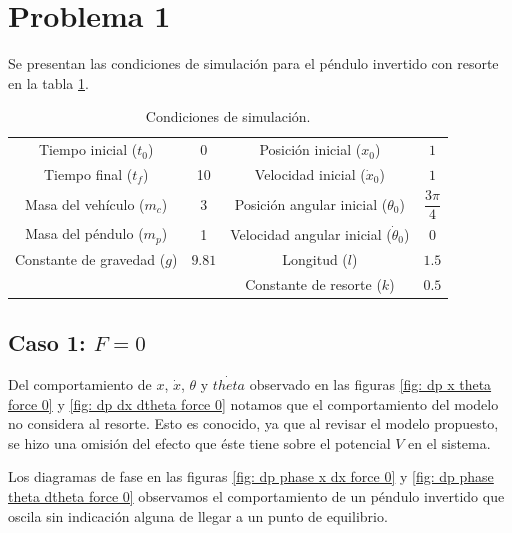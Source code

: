 \documentclass[12pt,letterpaper]{article}
\begin{document}
\section{Problema 1}

Se presentan las condiciones de simulación para el péndulo invertido con resorte en la tabla \ref{table: ip initial conditions}. 

\begin{table}[h]
\begin{center}
\centering
\begin{tabular}{cccc}
\hline
Tiempo inicial ($t_0$) & 0  & Posición inicial ($x_0$) & $1$ \\
Tiempo final ($t_f$) & 10 & Velocidad inicial ($\dot{x}_0$)& $1$\\
Masa del vehículo ($m_c$) & $3$ &  Posición angular inicial ($\theta_0$) & $\dfrac{3 \pi}{4}$\\
Masa del péndulo ($m_p$) & 1 & Velocidad angular inicial ($\dot{\theta}_0$)& $0$\\
Constante de gravedad ($g$) & $9.81$ & Longitud ($l$) & $1.5$ \\
&  & Constante de resorte ($k$) & $0.5$ \\
\hline
\end{tabular}
\end{center}
 \caption{Condiciones de simulación.}
 \label{table: ip initial conditions}
\end{table}


\subsection{Caso 1: $F=0$}

Del comportamiento de $x$, $\dot{x}$, $\theta$ y $\dot{theta}$ observado en las figuras \ref{fig: dp x theta force 0} y \ref{fig: dp dx dtheta force 0} notamos que el comportamiento del modelo no considera al resorte.
Esto es conocido, ya que al revisar el modelo propuesto, se hizo una omisión del efecto que éste tiene sobre el potencial $V$ en el sistema.

Los diagramas de fase en las figuras  \ref{fig: dp phase x dx force 0} y \ref{fig: dp phase theta dtheta force 0} observamos el comportamiento de un péndulo invertido que 
oscila sin indicación alguna de llegar a un punto de equilibrio.
\end{document}
